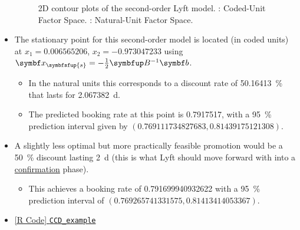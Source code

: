 \begin{itemize}
\begin{figure}[!htbp]
\begin{subfigure}{0.48\textwidth}
              \end{subfigure}
              \caption{2D contour plots of the second-order Lyft model.
                  : Coded-Unit Factor Space.
                  : Natural-Unit Factor Space.}\label{fig:Lyft}
          \end{figure}
    \item The stationary point for this second-order model is located (in coded units) at $ x_1 = \num{0.006565206}$,
          $ x_2 = \num{-0.973047233} $ using $ \Vector{x}_{\symbfsfup{s}}=-\frac{1}{2} \Matrix{B}^{-1}\Vector{b} $.
          \begin{itemize}
              \item In the natural units this corresponds to a discount rate of \qty{50.16413}{\percent} that lasts for \qty{2.067382}{\day}.
              \item The predicted booking rate at this point is \num{0.7917517}, with a \qty{95}{\percent} prediction interval given by
                    $(\num{0.769111734827683}, \num{0.81439175121308})$.
          \end{itemize}
    \item A slightly less optimal but more practically feasible promotion would be a
          \qty{50}{\percent} discount lasting \qty{2}{\day} (this is what Lyft should move forward with into a \underline{confirmation} phase).
          \begin{itemize}
              \item This achieves a booking rate of \num{0.791699940932622} with a \qty{95}{\percent} prediction interval of
                    $(\num{0.769265741331575}, \num{0.81413414053367})$.
          \end{itemize}
    \item \href{https://github.com/Hextical/university-notes/blob/master/year-3/semester-3/STAT 430/code/W12/CCD_example.R}{[R Code] \texttt{CCD\_example}}
\end{itemize}
